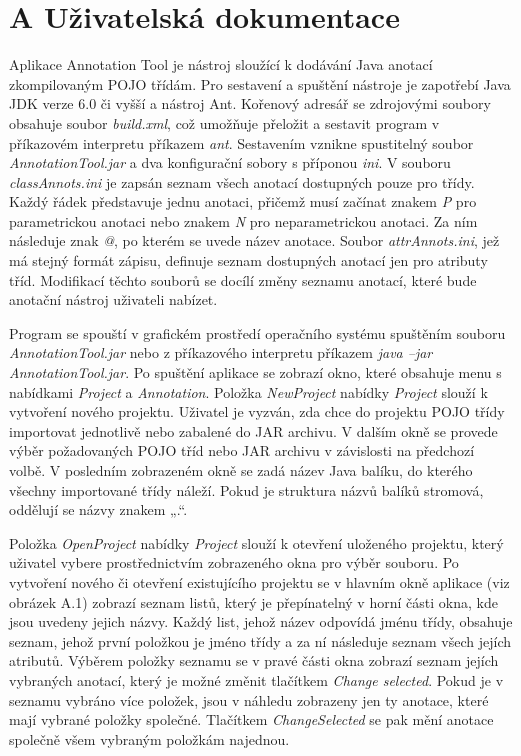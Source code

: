 \documentclass{projekt}
\begin{document}
\newpage
\thispagestyle{plain}
\section*{{\LARGE A} Uživatelská dokumentace}
\hspace{0.65cm}Aplikace Annotation Tool je nástroj sloužící k dodávání Java anotací zkompilovaným POJO třídám. Pro sestavení a spuštění nástroje je zapotřebí Java JDK verze 6.0 či vyšší a nástroj Ant. Kořenový adresář se zdrojovými soubory obsahuje soubor {\it build.xml}, což umožňuje přeložit a sestavit program v příkazovém interpretu příkazem {\it ant}. Sestavením vznikne spustitelný soubor {\it AnnotationTool.jar} a dva konfigurační sobory s příponou {\it ini}. V souboru
{\it classAnnots.ini} je zapsán seznam všech anotací dostupných pouze pro třídy. Každý řádek představuje jednu anotaci, přičemž musí začínat znakem {\it P} pro parametrickou anotaci nebo znakem {\it N} pro neparametrickou anotaci. Za ním následuje znak {\it @}, po kterém se uvede název anotace. Soubor {\it attrAnnots.ini}, jež má stejný formát zápisu, definuje seznam dostupných anotací jen pro atributy tříd. Modifikací těchto souborů se docílí změny seznamu anotací, které bude anotační nástroj uživateli nabízet.

Program se spouští v grafickém prostředí operačního systému spuštěním souboru {\it AnnotationTool.jar} nebo z příkazového interpretu příkazem {\it java –jar AnnotationTool.jar}. 
Po spuštění aplikace se zobrazí okno, které obsahuje menu s nabídkami {\it Project} a {\it Annotation}. 
Položka {\it NewProject} nabídky {\it Project} slouží k vytvoření nového projektu. Uživatel je vyzván, zda chce do projektu POJO třídy importovat jednotlivě nebo zabalené do JAR archivu. V dalším okně se provede výběr požadovaných POJO tříd nebo JAR archivu v závislosti na předchozí volbě. V posledním zobrazeném okně se zadá název Java balíku, do kterého všechny importované třídy náleží. Pokud je struktura názvů balíků stromová, oddělují se názvy znakem „.“.


Položka {\it OpenProject} nabídky {\it Project} slouží k otevření uloženého projektu, který uživatel vybere prostřednictvím zobrazeného okna pro výběr souboru. 
Po vytvoření nového či otevření existujícího projektu se v hlavním okně aplikace (viz obrázek A.1) zobrazí seznam listů, který je přepínatelný v horní části okna, kde jsou uvedeny jejich názvy. Každý list, jehož název odpovídá jménu třídy, obsahuje seznam, jehož první položkou je jméno třídy a za ní následuje seznam všech jejích atributů. Výběrem položky seznamu se v pravé části okna zobrazí seznam jejích vybraných anotací, který je možné změnit tlačítkem {\it Change selected}. Pokud je v seznamu vybráno více položek, jsou v náhledu zobrazeny jen ty anotace, které mají vybrané položky společné. Tlačítkem {\it ChangeSelected} se pak mění anotace společně všem vybraným položkám najednou.\\
\end{document}
